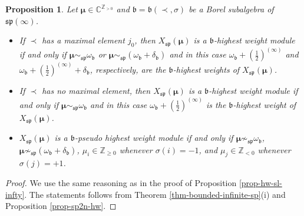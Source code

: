 \documentclass[12pt]{amsart}
\newcommand{\Z}{{\mathbb Z}}
\def\gb{\mathfrak{b}}
\def\Z{\mathbb{Z}}
\newtheorem{prop}[thm]{Proposition}
\begin{document}
\begin{prop} \label{prop-hw-sp-infty} Let $\boldsymbol{\mu} \in {\mathbb C}^{{\mathbb Z}_{>0}}$ and $\gb = \gb (\prec, \sigma)$ be a Borel subalgebra of  $\mathfrak{sp} (\infty)$. 

\begin{itemize}
\item[(i)] If $\prec$ has a maximal element $j_0$, then $X_{\mathfrak{sp}} (\boldsymbol{\mu})$ is a $\mathfrak b$-highest weight module if and only if $\boldsymbol{\mu} \sim_{\mathfrak{sp}} \omega_{\gb}$  or $\boldsymbol{\mu} \sim_{\mathfrak{sp}} (\omega_{\gb} + \delta_{\gb} )$ and in this case $\omega_{\gb}+ \left(\frac{1}{2}\right)^{(\infty)} $ and $\omega_{\gb} + \left(\frac{1}{2}\right)^{(\infty)}  + \delta_{\gb}$, respectively, are the $\gb$-highest weights of $X_{\mathfrak{sp}}(\boldsymbol{\mu})$. 

\item[(ii)]  If $\prec$ has no maximal element, then $X_{\mathfrak{sp}} (\boldsymbol{\mu})$ is a $\mathfrak b$-highest weight module if and only if $\boldsymbol{\mu} \sim_{\mathfrak{sp}} \omega_{\gb}$  and in this case $\omega_{\gb}+ \left(\frac{1}{2}\right)^{(\infty)} $  is the $\gb$-highest weight of $X_{\mathfrak{sp}} (\boldsymbol{\mu})$.

\item[(iii)] $X_{\mathfrak{sp}} (\boldsymbol{\mu})$ is a $\mathfrak b$-pseudo highest weight module if and only if $\boldsymbol{\mu} \not\sim_{\mathfrak{sp}} \omega_{\gb}$,  $\boldsymbol{\mu} \not\sim_{\mathfrak{sp}} (\omega_{\gb} + \delta_{\gb} )$, $\mu_i \in \Z_{\geq 0}$ whenever $\sigma(i) = -1$, and $\mu_j \in \Z_{<0}$ whenever $\sigma(j) = +1$. 
\end{itemize}
\end{prop}
\begin{proof}
We use the same reasoning as in the proof of Proposition \ref{prop-hw-sl-infty}. The statements follows from Theorem \ref{thm-bounded-infinite-sp}(i) and Proposition \ref{prop-sp2n-hw}. 
\end{proof}
\end{document}

